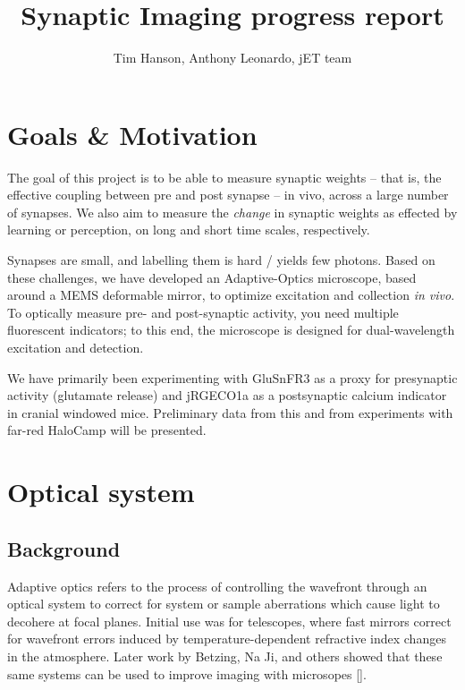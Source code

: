 \documentclass[a4paper,10pt]{article}
\title{Synaptic Imaging progress report}
\author{Tim Hanson, Anthony Leonardo, jET team}
\begin{document}
\maketitle

\begin{abstract}

\end{abstract}

\section{Goals \& Motivation}

The goal of this project is to be able to measure synaptic weights -- that is, the effective coupling between pre and post synapse -- in vivo, across a large number of synapses.  We also aim to measure the \textit{change} in synaptic weights as effected by learning or perception, on long and short time scales, respectively.  

Synapses are small, and labelling them is hard / yields few photons.  Based on these challenges, we have developed an Adaptive-Optics microscope, based around a MEMS deformable mirror, to optimize excitation and collection \textit{in vivo}.  To optically measure pre- and post-synaptic activity, you need multiple fluorescent indicators; to this end, the microscope is designed for dual-wavelength excitation and detection.  

We have primarily been experimenting with GluSnFR3 as a proxy for presynaptic activity (glutamate release) and jRGECO1a as a postsynaptic calcium indicator in cranial windowed mice.  Preliminary data from this and from experiments with far-red HaloCamp will be presented.  

\section{Optical system}

\subsection{Background}

Adaptive optics refers to the process of controlling the wavefront through an optical system to correct for system or sample aberrations which cause light to decohere at focal planes.  Initial use was for telescopes, where fast mirrors correct for wavefront errors induced by temperature-dependent refractive index changes in the atmosphere.  Later work by Betzing, Na Ji, and others showed that these same systems can be used to improve imaging with microsopes [].  
\end{document}
